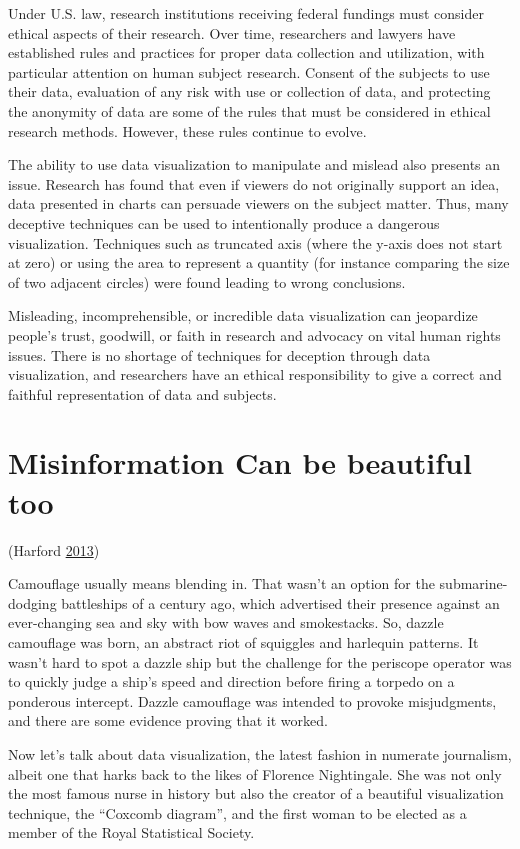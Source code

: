 \documentclass[]{book}
\theoremstyle{definition}
\theoremstyle{definition}
\theoremstyle{definition}
\theoremstyle{remark}
\begin{document}
Under U.S. law, research institutions receiving federal fundings must
consider ethical aspects of their research. Over time, researchers and
lawyers have established rules and practices for proper data collection
and utilization, with particular attention on human subject research.
Consent of the subjects to use their data, evaluation of any risk with
use or collection of data, and protecting the anonymity of data are some
of the rules that must be considered in ethical research methods.
However, these rules continue to evolve.

The ability to use data visualization to manipulate and mislead also
presents an issue. Research has found that even if viewers do not
originally support an idea, data presented in charts can persuade
viewers on the subject matter. Thus, many deceptive techniques can be
used to intentionally produce a dangerous visualization. Techniques such
as truncated axis (where the y-axis does not start at zero) or using the
area to represent a quantity (for instance comparing the size of two
adjacent circles) were found leading to wrong conclusions.

Misleading, incomprehensible, or incredible data visualization can
jeopardize people's trust, goodwill, or faith in research and advocacy
on vital human rights issues. There is no shortage of techniques for
deception through data visualization, and researchers have an ethical
responsibility to give a correct and faithful representation of data and
subjects.

\section{Misinformation Can be beautiful
too}\label{misinformation-can-be-beautiful-too}

(Harford \protect\hyperlink{ref-harford-misinformation}{2013})

Camouflage usually means blending in. That wasn't an option for the
submarine-dodging battleships of a century ago, which advertised their
presence against an ever-changing sea and sky with bow waves and
smokestacks. So, dazzle camouflage was born, an abstract riot of
squiggles and harlequin patterns. It wasn't hard to spot a dazzle ship
but the challenge for the periscope operator was to quickly judge a
ship's speed and direction before firing a torpedo on a ponderous
intercept. Dazzle camouflage was intended to provoke misjudgments, and
there are some evidence proving that it worked.

Now let's talk about data visualization, the latest fashion in numerate
journalism, albeit one that harks back to the likes of Florence
Nightingale. She was not only the most famous nurse in history but also
the creator of a beautiful visualization technique, the ``Coxcomb
diagram'', and the first woman to be elected as a member of the Royal
Statistical Society.
\end{document}
